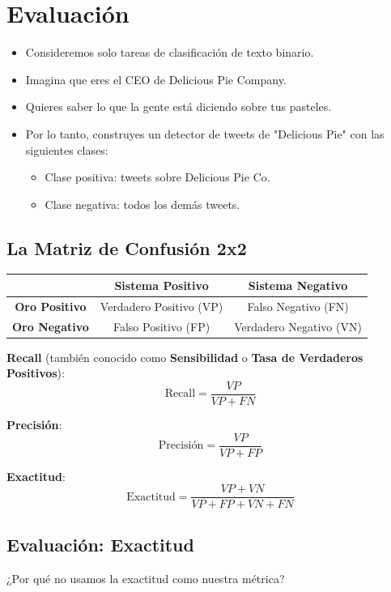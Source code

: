 \section{Evaluación}

\begin{itemize}
 \item Consideremos solo tareas de clasificación de texto binario.
 \item Imagina que eres el CEO de Delicious Pie Company.
 \item Quieres saber lo que la gente está diciendo sobre tus pasteles.
 \item Por lo tanto, construyes un detector de tweets de "Delicious Pie" con las siguientes clases:
\begin{itemize}
\item Clase positiva: tweets sobre Delicious Pie Co.
\item Clase negativa: todos los demás tweets.
\end{itemize}
\end{itemize}



\subsection{La Matriz de Confusión 2x2}
\begin{table}[h]
\centering
\begin{tabular}{|c|c|c|}
\hline
\textbf{} & \textbf{Sistema Positivo} & \textbf{Sistema Negativo} \\
\hline
\textbf{Oro Positivo} & Verdadero Positivo (VP) & Falso Negativo (FN) \\
\hline
\textbf{Oro Negativo} & Falso Positivo (FP) & Verdadero Negativo (VN) \\
\hline
\end{tabular}
\end{table}

\textbf{Recall} (también conocido como \textbf{Sensibilidad} o \textbf{Tasa de Verdaderos Positivos}):
\[ \text{Recall} = \frac{VP}{VP + FN} \]

\textbf{Precisión}:
\[ \text{Precisión} = \frac{VP}{VP + FP} \]

\textbf{Exactitud}:
\[ \text{Exactitud} = \frac{VP + VN}{VP + FP + VN + FN} \]


\subsection{Evaluación: Exactitud}
¿Por qué no usamos la exactitud como nuestra métrica?

